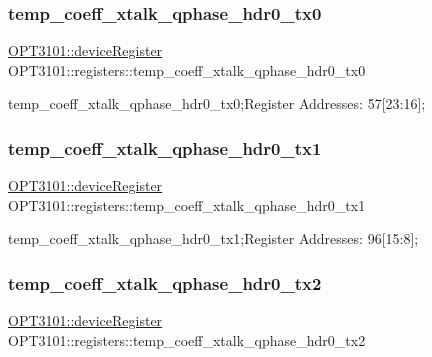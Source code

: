\subsubsection{\texorpdfstring{temp\+\_\+coeff\+\_\+xtalk\+\_\+qphase\+\_\+hdr0\+\_\+tx0}{temp\_coeff\_xtalk\_qphase\_hdr0\_tx0}}
{\footnotesize\ttfamily \mbox{\hyperlink{class_o_p_t3101_1_1device_register}{O\+P\+T3101\+::device\+Register}} O\+P\+T3101\+::registers\+::temp\+\_\+coeff\+\_\+xtalk\+\_\+qphase\+\_\+hdr0\+\_\+tx0}



temp\+\_\+coeff\+\_\+xtalk\+\_\+qphase\+\_\+hdr0\+\_\+tx0;Register Addresses\+: 57\mbox{[}23\+:16\mbox{]}; 

\mbox{\label{class_o_p_t3101_1_1registers_af9e734f02f4167d52f64655999810b36}} 
\subsubsection{\texorpdfstring{temp\+\_\+coeff\+\_\+xtalk\+\_\+qphase\+\_\+hdr0\+\_\+tx1}{temp\_coeff\_xtalk\_qphase\_hdr0\_tx1}}
{\footnotesize\ttfamily \mbox{\hyperlink{class_o_p_t3101_1_1device_register}{O\+P\+T3101\+::device\+Register}} O\+P\+T3101\+::registers\+::temp\+\_\+coeff\+\_\+xtalk\+\_\+qphase\+\_\+hdr0\+\_\+tx1}



temp\+\_\+coeff\+\_\+xtalk\+\_\+qphase\+\_\+hdr0\+\_\+tx1;Register Addresses\+: 96\mbox{[}15\+:8\mbox{]}; 

\mbox{\label{class_o_p_t3101_1_1registers_a78cc3027c311e7e089ffc80aace9aba7}} 
\subsubsection{\texorpdfstring{temp\+\_\+coeff\+\_\+xtalk\+\_\+qphase\+\_\+hdr0\+\_\+tx2}{temp\_coeff\_xtalk\_qphase\_hdr0\_tx2}}
{\footnotesize\ttfamily \mbox{\hyperlink{class_o_p_t3101_1_1device_register}{O\+P\+T3101\+::device\+Register}} O\+P\+T3101\+::registers\+::temp\+\_\+coeff\+\_\+xtalk\+\_\+qphase\+\_\+hdr0\+\_\+tx2}



